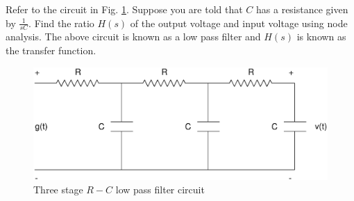 \documentclass[journal,12pt,twocolumn]{IEEEtran}
\begin{document}
%
\begin{problem}
Refer to the circuit in Fig. \ref{fig:2.1}. Suppose you are told that $C$ has a resistance given by $\frac{1}{s  C}$.   Find the ratio $H(s)$ of the output voltage and input voltage using node analysis.  The above circuit is known as a low pass filter and $H(s)$ is known as the transfer function.
\end{problem}
%
%
\begin{figure}[!h]
\centering
\includegraphics[width=\columnwidth]{./figs/2.1.eps}
\caption{Three stage $R-C$ low pass filter circuit}
\label{fig:2.1}
\end{figure}
%
\end{document}
